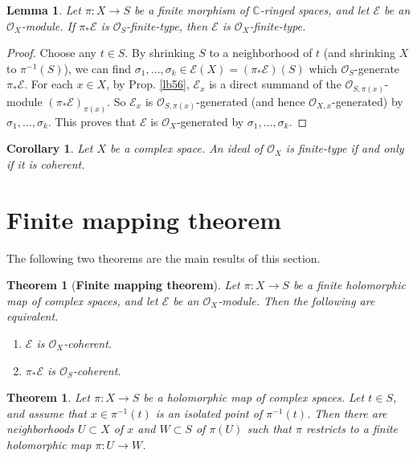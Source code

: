 \documentclass[12pt,b5paper,notitlepage]{report}
\theoremstyle{definition}
\theoremstyle{plain}
\newtheorem{thm}[df]{Theorem}
\newtheorem{co}[df]{Corollary}
\newtheorem{lm}[df]{Lemma}
\newcommand{\scr}{\mathscr}
\newcommand{\Cbb}{\mathbb C}
\numberwithin{equation}{section}
\begin{document}
\begin{lm}\label{lb85}
Let $\pi:X\rightarrow S$ be a finite morphism of $\Cbb$-ringed spaces, and let $\scr E$ be an $\scr O_X$-module. If $\pi_*\scr E$ is $\scr O_S$-finite-type, then $\scr E$ is $\scr O_X$-finite-type.
\end{lm}


\begin{proof}
Choose any $t\in S$. By shrinking $S$ to a neighborhood of $t$ (and shrinking $X$ to $\pi^{-1}(S)$), we can find $\sigma_1,\dots,\sigma_k\in\scr E(X)=(\pi_*\scr E)(S)$ which $\scr O_S$-generate $\pi_*\scr E$. For each $x\in X$, by Prop. \ref{lb56}, $\scr E_x$ is a direct summand of the $\scr O_{S,\pi(x)}$-module $(\pi_*\scr E)_{\pi(x)}$. So $\scr E_x$ is $\scr O_{S,\pi(x)}$-generated (and hence $\scr O_{X,x}$-generated) by $\sigma_1,\dots,\sigma_k$. This proves that $\scr E$ is $\scr O_X$-generated by $\sigma_1,\dots,\sigma_k$.
\end{proof}


\begin{co}
Let $X$ be a complex space. An ideal of $\scr O_X$ is finite-type if and only if it is coherent.
\end{co}



\section{Finite mapping theorem}

The following two theorems are the main results of this section.


\begin{thm}[\textbf{Finite mapping theorem}]\label{lb74}
Let $\pi:X\rightarrow S$ be a finite holomorphic map of complex spaces, and let $\scr E$ be an $\scr O_X$-module. Then the following are equivalent.
\begin{enumerate}[label=(\arabic*)]
\item $\scr E$ is $\scr O_X$-coherent.
\item $\pi_*\scr E$ is $\scr O_S$-coherent.
\end{enumerate}
\end{thm}


\begin{thm}\label{lb75}
Let $\pi:X\rightarrow S$ be a holomorphic map of complex spaces. Let $t\in S$, and assume that $x\in\pi^{-1}(t)$ is an isolated point of $\pi^{-1}(t)$. Then there are neighborhoods $U\subset X$ of $x$ and $W\subset S$ of $\pi(U)$ such that $\pi$ restricts to a finite holomorphic map $\pi:U\rightarrow W$.
\end{thm}
\end{document}
